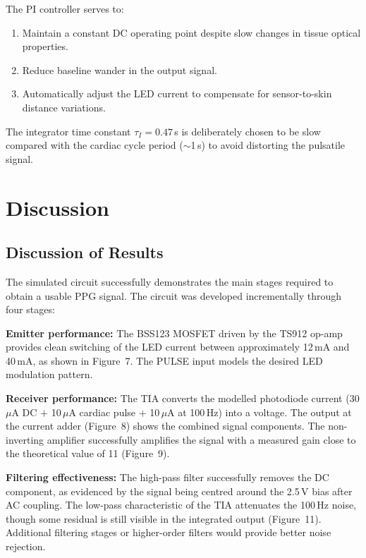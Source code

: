 \documentclass[10pt]{article}
\begin{document}
The PI controller serves to:
\begin{enumerate}
    \item Maintain a constant DC operating point despite slow changes in tissue optical properties.
    \item Reduce baseline wander in the output signal.
    \item Automatically adjust the LED current to compensate for sensor-to-skin distance variations.
\end{enumerate}

The integrator time constant $\tau_I = 0.47$\,s is deliberately chosen to be slow compared with the cardiac cycle period ($\sim$1\,s) to avoid distorting the pulsatile signal.


\section{Discussion}

\subsection{Discussion of Results}

The simulated circuit successfully demonstrates the main stages required to obtain a usable PPG signal. The circuit was developed incrementally through four stages:

\textbf{Emitter performance:} The BSS123 MOSFET driven by the TS912 op-amp provides clean switching of the LED current between approximately 12\,mA and 40\,mA, as shown in Figure~7. The PULSE input models the desired LED modulation pattern.

\textbf{Receiver performance:} The TIA converts the modelled photodiode current (30\,$\mu$A DC $+$ 10\,$\mu$A cardiac pulse $+$ 10\,$\mu$A at 100\,Hz) into a voltage. The output at the current adder (Figure~8) shows the combined signal components. The non-inverting amplifier successfully amplifies the signal with a measured gain close to the theoretical value of 11 (Figure~9).

\textbf{Filtering effectiveness:} The high-pass filter successfully removes the DC component, as evidenced by the signal being centred around the 2.5\,V bias after AC coupling. The low-pass characteristic of the TIA attenuates the 100\,Hz noise, though some residual is still visible in the integrated output (Figure~11). Additional filtering stages or higher-order filters would provide better noise rejection.
\end{document}
